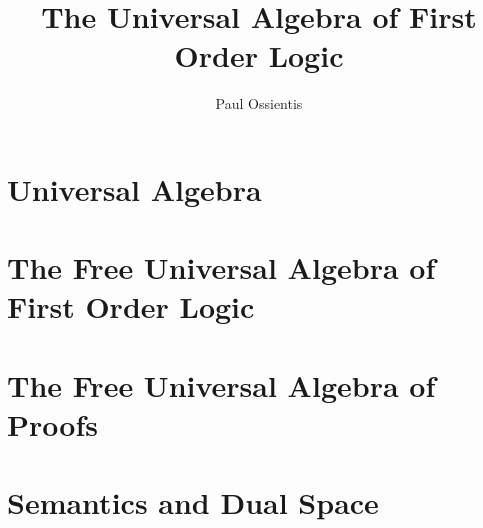 \documentclass{report}
\title{The Universal Algebra of
  First Order Logic}
\author{Paul Ossientis}
\begin{document}
\maketitle
\tableofcontents
\newpage
\chapter{Universal Algebra}
    
\chapter{The Free Universal Algebra of First Order Logic}
    
\chapter{The Free Universal Algebra of Proofs}
    
\chapter{Semantics and Dual Space}
    
%    
%    
\printindex

\end{document}
